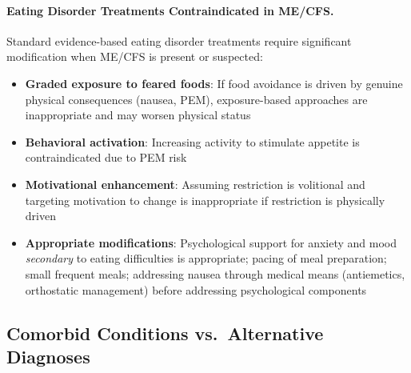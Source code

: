 \paragraph{Eating Disorder Treatments Contraindicated in ME/CFS.}
Standard evidence-based eating disorder treatments require significant modification when ME/CFS is present or suspected:

\begin{itemize}
    \item \textbf{Graded exposure to feared foods}: If food avoidance is driven by genuine physical consequences (nausea, PEM), exposure-based approaches are inappropriate and may worsen physical status
    \item \textbf{Behavioral activation}: Increasing activity to stimulate appetite is contraindicated due to PEM risk
    \item \textbf{Motivational enhancement}: Assuming restriction is volitional and targeting motivation to change is inappropriate if restriction is physically driven
    \item \textbf{Appropriate modifications}: Psychological support for anxiety and mood \emph{secondary} to eating difficulties is appropriate; pacing of meal preparation; small frequent meals; addressing nausea through medical means (antiemetics, orthostatic management) before addressing psychological components
\end{itemize}

\subsection{Comorbid Conditions vs.\ Alternative Diagnoses}

